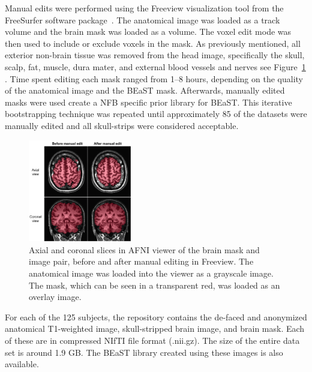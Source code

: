 \par Manual edits were performed using the Freeview visualization tool from the FreeSurfer software package~\cite{Fischl2012}. The anatomical image was loaded as a track volume and the brain mask was loaded as a volume. The voxel edit mode was then used to include or exclude voxels in the mask. As previously mentioned, all exterior non-brain tissue was removed from the head image, specifically the skull, scalp, fat, muscle, dura mater, and external blood vessels and nerves \DIFdelbegin %
\DIFdelend \DIFaddbegin \DIFadd{(}\DIFaddend see Figure~\ref{fig:edit}\DIFdelbegin %
\DIFdelend \DIFaddbegin \DIFadd{)}\DIFaddend . Time spent editing each mask ranged from 1--8 hours, depending on the quality of the anatomical image and the BEaST mask. Afterwards, manually edited masks were used create a NFB specific prior library for BEaST. This iterative bootstrapping technique was repeated until approximately 85 of the datasets were manually edited and all skull-strips were considered \DIFdelbegin {}\DIFdelend acceptable.

\begin{figure}[h!]
    \includegraphics[width=0.4\textwidth]{edit.png}
    \caption{
Axial and coronal slices in \DIFaddbeginFL {}\DIFaddendFL AFNI viewer of the brain mask and image pair, before and after manual editing in Freeview. The anatomical \DIFdelbeginFL {}\DIFdelendFL image was loaded into the viewer as a grayscale image. The mask, which can be seen in a transparent red, was loaded as an overlay image.}
\label{fig:edit}
\end{figure}

For each of the 125 subjects, the repository contains the de-faced and anonymized anatomical T1-weighted image, skull-stripped brain image, and brain mask. Each of these are in compressed NIfTI file format (.nii.gz). The size of the entire data set is around 1.9 GB. The BEaST library created using these images is also available.



